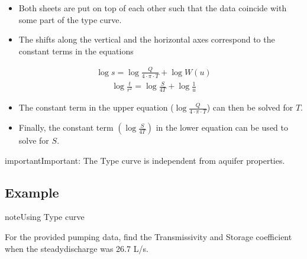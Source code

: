 \documentclass[letterpaper,10pt,english]{jupyterBook}
\let\sphinxpxdimen\pdfpxdimen\else\newdimen\sphinxpxdimen
\begin{document}
\noindent{\hspace*{\fill}\sphinxincludegraphics[width=600\sphinxpxdimen]{{L08_f11}.png}\hspace*{\fill}}
\begin{itemize}
\item {} 
\sphinxAtStartPar
Both sheets are put on top of each other such that the data coincide with some part of the type curve.

\item {} 
\sphinxAtStartPar
The shifts along the vertical and the horizontal axes correspond to the constant terms in the equations

\end{itemize}
\begin{equation*}
\begin{split}
\log s = \log\frac{Q}{4\cdot \pi \cdot T} + \log W(u)
\end{split}
\end{equation*}\begin{equation*}
\begin{split}
\log \frac{t}{r^2} = \log\frac{S}{4 T} + \log \frac{1}{u} 
\end{split}
\end{equation*}\begin{itemize}
\item {} 
\sphinxAtStartPar
The constant term in the upper equation (\(\log\frac{Q}{4\cdot \pi \cdot T}\)) can then be solved for \(T\).

\item {} 
\sphinxAtStartPar
Finally, the constant term \((\log\frac{S}{4 T})\) in the lower equation can be used to solve for \(S\).

\end{itemize}

\begin{sphinxadmonition}{important}{Important:}
\sphinxAtStartPar
The Type curve is independent from aquifer properties.
\end{sphinxadmonition}


\subsection{Example}
\label{\detokenize{content/flow/L8/18_wells:example}}
\begin{sphinxadmonition}{note}{Using Type curve}

\sphinxAtStartPar
For the provided pumping data, find the Transmissivity and Storage coefficient when the steady\sphinxhyphen{}discharge was 26.7 L/s.
\end{sphinxadmonition}
\end{document}
